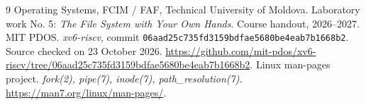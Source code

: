 \begin{thebibliography}{9}
 Operating Systems, FCIM / FAF, Technical University of Moldova.
Laboratory work No. 5: \emph{The File System with Your Own Hands}. Course handout, 2026--2027.
 MIT PDOS. \emph{xv6-riscv}, commit
\texttt{06aad25c735fd3159bdfae5680be4eab7b1668b2}.
Source checked on 23 October 2026.
\url{https://github.com/mit-pdos/xv6-riscv/tree/06aad25c735fd3159bdfae5680be4eab7b1668b2}.
 Linux man-pages project. \emph{fork(2), pipe(7), inode(7), path\_resolution(7)}.
\url{https://man7.org/linux/man-pages/}.
\end{thebibliography}
